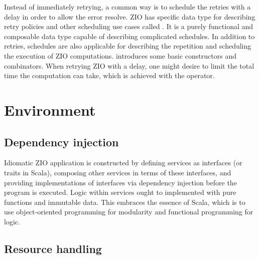 Instead of immediately retrying, a common way is to schedule the retries with a delay in order to allow the error resolve. ZIO has specific data type for describing retry policies and other scheduling use cases called . It is a purely functional and composable data type capable of describing complicated schedules. In addition to retries, schedules are also applicable for describing the repetition and scheduling the execution of ZIO computations.  introduces some basic  constructors and combinators. When retrying ZIO with a delay, one might desire to limit the total time the computation can take, which is achieved with the  operator.




\section{Environment}




\subsection{Dependency injection}
Idiomatic ZIO application is constructed by defining services as interfaces (or traits in Scala), composing other services in terms of these interfaces, and providing implementations of interfaces via dependency injection before the program is executed. Logic within services ought to implemented with pure functions and immutable data. This embraces the essence of Scala, which is to use object-oriented programming for modularity and functional programming for logic.
% 


\subsection{Resource handling} \label{zio:resource-handling}

